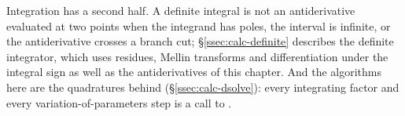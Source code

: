 
Integration has a second half. A definite integral is not an antiderivative
evaluated at two points when the integrand has poles, the interval is infinite, or
the antiderivative crosses a branch cut; \S\ref{ssec:calc-definite} describes the
definite integrator, which uses residues, Mellin transforms and differentiation
under the integral sign as well as the antiderivatives of this chapter. And the
algorithms here are the quadratures behind 
(\S\ref{ssec:calc-dsolve}): every integrating factor and every
variation-of-parameters step is a call to .
